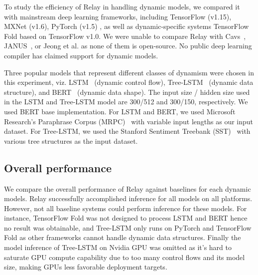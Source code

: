     To study the efficiency of Relay in handling dynamic models, we compared it with mainstream deep learning frameworks, including TensorFlow (v1.15), MXNet (v1.6), PyTorch (v1.5) \footnotemark, as well as dynamic-specific systems TensorFlow Fold based on TensorFlow v1.0.
    We were unable to compare Relay with Cavs~\citep{xu2018cavs}, JANUS~\citep{jeong2019janus}, or Jeong et al.\citep{jeong2018improving} as none of them is open-source. No public deep learning compiler has claimed support for dynamic models.

    Three popular models that represent different classes of dynamism were chosen in this experiment, viz. LSTM~\citep{lstm} (dynamic control flow), Tree-LSTM~\citep{tree_lstm} (dynamic data structure), and BERT~\citep{devlin2018bert} (dynamic data shape).
    The input size / hidden size used in the LSTM and Tree-LSTM model are 300/512 and 300/150, respectively.
    We used BERT base implementation.
    For LSTM and BERT, we used Microsoft Research's Paraphrase Corpus (MRPC)~\citep{dolan2005microsoft} with variable input lengths as our input dataset. For Tree-LSTM, we used the Stanford Sentiment Treebank (SST)~\citep{socher2013recursive} with various tree structures as the input dataset.

    \subsection{Overall performance}
    \label{sec:eval:overall}
    We compare the overall performance of Relay against baselines for each dynamic models. Relay successfully accomplished inference for all models on all platforms. However, not all baseline systems could perform inference for these models. For instance, TensorFlow Fold was not designed to process LSTM and BERT hence no result was obtainable, and Tree-LSTM only runs on PyTorch and TensorFlow Fold as other frameworks cannot handle dynamic data structures. Finally the model inference of Tree-LSTM on Nvidia GPU was omitted as it's hard to saturate GPU compute capability due to too many control flows and its model size, making GPUs less favorable deployment targets.

